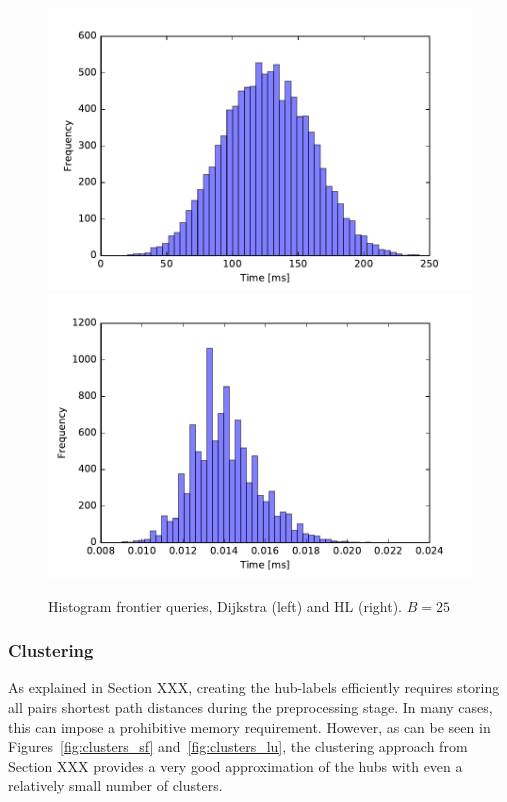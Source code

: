 \begin{figure}
\begin{center}
\includegraphics[clip, trim=0.6cm 0.3cm 1.2cm 0.8cm,scale=0.3]{TexImg/SF_query_dij_B25.pdf}
\includegraphics[clip, trim=0.9cm 0.3cm 1.1cm 0.8cm,scale=0.3]{TexImg/SF_query_hl_B25.pdf}
\end{center}
\caption{Histogram frontier queries, Dijkstra (left) and HL (right). $B=25$}\label{fig:SF_query}
\end{figure}


\subsubsection{Clustering}

As explained in Section XXX, creating the hub-labels efficiently requires storing all pairs shortest path distances during the preprocessing stage. In many cases, this can impose a prohibitive memory requirement. However, as can be seen in Figures~\ref{fig:clusters_sf} and~\ref{fig:clusters_lu}, the clustering approach from Section XXX provides a very good approximation of the hubs with even a relatively small number of clusters. 

